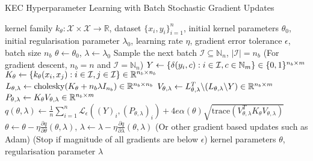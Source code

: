 \documentclass{article}
\begin{document}
	\begin{algorithm}[tb]
		\caption{KEC Hyperparameter Learning with Batch Stochastic Gradient Updates}
		\label{alg:kernel_embedding_classifier_training}
		\begin{algorithmic}[1]
			 kernel family $k_{\theta} : \mathcal{X} \times \mathcal{X} \to \mathbb{R}$, dataset $\{x_{i}, y_{i}\}_{i = 1}^{n}$, initial kernel parameters $\theta_{0}$, initial regularisation parameter $\lambda_{0}$, learning rate $\eta$, gradient error tolerance $\epsilon$, batch size $n_{b}$
			\STATE $\theta \leftarrow \theta_{0}$, $\lambda \leftarrow \lambda_{0}$
			\REPEAT
			\STATE Sample the next batch $\mathcal{I} \subseteq \mathbb{N}_{n}$, $| \mathcal{I} | = n_{b}$ \hspace{\fill} (For gradient descent, $n_{b} = n$ and $\mathcal{I} = \mathbb{N}_{n}$)
			\STATE $Y \leftarrow \{\delta(y_{i}, c) : i \in \mathcal{I}, c \in \mathbb{N}_{m}\} \hspace{\fill} \in \{0, 1\}^{n_{b} \times m}$
			\STATE $K_{\theta} \leftarrow \{k_{\theta}(x_{i}, x_{j}) : i \in \mathcal{I}, j \in \mathcal{I}\} \hspace{\fill} \in \mathbb{R}^{n_{b} \times n_{b}}$
			\STATE $L_{\theta, \lambda} \leftarrow \mathrm{cholesky}(K_{\theta} + n_{b} \lambda I_{n_{b}}) \hspace{\fill} \in \mathbb{R}^{n_{b} \times n_{b}}$
			\STATE $V_{\theta, \lambda} \leftarrow L_{\theta, \lambda}^{T} \backslash (L_{\theta, \lambda} \backslash Y) \hspace{\fill} \in \mathbb{R}^{n_{b} \times m}$
			\STATE $P_{\theta, \lambda} \leftarrow K_{\theta} V_{\theta, \lambda} \hspace{\fill} \in \mathbb{R}^{n_{b} \times m}$
			\STATE $q(\theta, \lambda) \leftarrow \frac{1}{n} \sum_{i = 1}^{n} \mathcal{L}_{\epsilon}((Y)_{i}, (P_{\theta, \lambda})_{i}) + 4 e \alpha(\theta) \sqrt{\mathrm{trace}(V_{\theta, \lambda}^{T} K_{\theta} V_{\theta, \lambda})}$
			\STATE $\theta \leftarrow \theta - \eta \frac{\partial q}{\partial \theta}(\theta, \lambda)$, $\lambda \leftarrow \lambda - \eta \frac{\partial q}{\partial \lambda}(\theta, \lambda)$ \hspace{\fill} (Or other gradient based updates such as Adam)
			 \hspace{\fill} (Stop if magnitude of all gradients are below $\epsilon$)
			 kernel parameters $\theta$, regularisation parameter $\lambda$
		\end{algorithmic}
	\end{algorithm}
\end{document}
